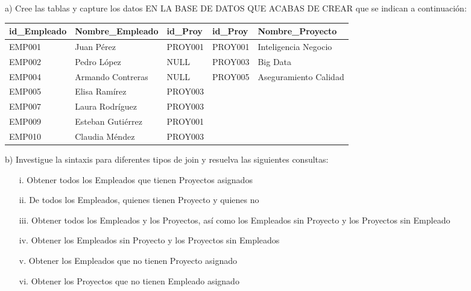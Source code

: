 \documentclass{article}
\begin{document}
a) Cree las tablas y capture los datos EN LA BASE DE DATOS QUE ACABAS DE CREAR que se indican a continuación:

\begin{table}[H]
    \centering
    \begin{tabular}{|l|l|l|l|l|}
        \hline
        \textbf{id\_Empleado} & \textbf{Nombre\_Empleado} & \textbf{id\_Proy} & \textbf{id\_Proy} & \textbf{Nombre\_Proyecto} \\
        \hline
        EMP001 & Juan Pérez & PROY001 & PROY001 & Inteligencia Negocio \\
        \hline
        EMP002 & Pedro López & NULL & PROY003 & Big Data \\
        \hline
        EMP004 & Armando Contreras & NULL & PROY005 & Aseguramiento Calidad \\
        \hline
        EMP005 & Elisa Ramírez & PROY003 & & \\
        \hline
        EMP007 & Laura Rodríguez & PROY003 & & \\
        \hline
        EMP009 & Esteban Gutiérrez & PROY001 & & \\
        \hline
        EMP010 & Claudia Méndez & PROY003 & & \\
        \hline
    \end{tabular}
\end{table}

b) Investigue la sintaxis para diferentes tipos de join y resuelva las siguientes consultas:

\begin{enumerate}
    \item[i.] Obtener todos los Empleados que tienen Proyectos asignados
    
    \item[ii.] De todos los Empleados, quienes tienen Proyecto y quienes no
    
    \item[iii.] Obtener todos los Empleados y los Proyectos, así como los Empleados sin Proyecto y los Proyectos sin Empleado
    
    \item[iv.] Obtener los Empleados sin Proyecto y los Proyectos sin Empleados
    
    \item[v.] Obtener los Empleados que no tienen Proyecto asignado
    
    \item[vi.] Obtener los Proyectos que no tienen Empleado asignado
\end{enumerate}
\end{document}
